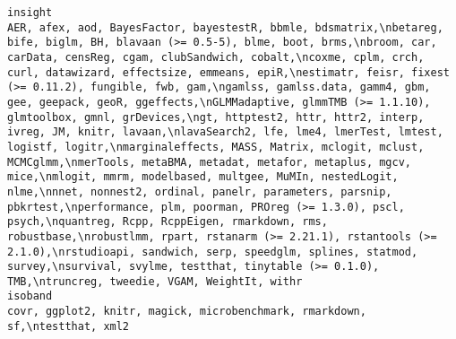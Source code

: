\documentclass[
  letterpaper,
  DIV=11,
  numbers=noendperiod]{scrreprt}
\begin{document}
\begin{verbatim}
insight                                                                                                           AER, afex, aod, BayesFactor, bayestestR, bbmle, bdsmatrix,\nbetareg, bife, biglm, BH, blavaan (>= 0.5-5), blme, boot, brms,\nbroom, car, carData, censReg, cgam, clubSandwich, cobalt,\ncoxme, cplm, crch, curl, datawizard, effectsize, emmeans, epiR,\nestimatr, feisr, fixest (>= 0.11.2), fungible, fwb, gam,\ngamlss, gamlss.data, gamm4, gbm, gee, geepack, geoR, ggeffects,\nGLMMadaptive, glmmTMB (>= 1.1.10), glmtoolbox, gmnl, grDevices,\ngt, httptest2, httr, httr2, interp, ivreg, JM, knitr, lavaan,\nlavaSearch2, lfe, lme4, lmerTest, lmtest, logistf, logitr,\nmarginaleffects, MASS, Matrix, mclogit, mclust, MCMCglmm,\nmerTools, metaBMA, metadat, metafor, metaplus, mgcv, mice,\nmlogit, mmrm, modelbased, multgee, MuMIn, nestedLogit, nlme,\nnnet, nonnest2, ordinal, panelr, parameters, parsnip, pbkrtest,\nperformance, plm, poorman, PROreg (>= 1.3.0), pscl, psych,\nquantreg, Rcpp, RcppEigen, rmarkdown, rms, robustbase,\nrobustlmm, rpart, rstanarm (>= 2.21.1), rstantools (>= 2.1.0),\nrstudioapi, sandwich, serp, speedglm, splines, statmod, survey,\nsurvival, svylme, testthat, tinytable (>= 0.1.0), TMB,\ntruncreg, tweedie, VGAM, WeightIt, withr
isoband                                                                                                                                                                                                                                                                                                                                                                                                                                                                                                                                                                                                                                                                                                                                                                                                                                                                                                                                                                                                                                                                                                                                                                                                                          covr, ggplot2, knitr, magick, microbenchmark, rmarkdown, sf,\ntestthat, xml2

\end{verbatim}
\end{document}
